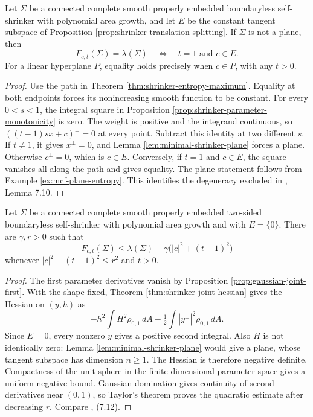 \begin{proposition}\label{prop:shrinker-gaussian-equality}
Let $\Sigma$ be a connected complete smooth properly embedded boundaryless self-shrinker with polynomial area growth, and let $E$ be the constant tangent subspace of Proposition \ref{prop:shrinker-translation-splitting}. If $\Sigma$ is not a plane, then
\[
 F_{c,t}(\Sigma)=\lambda(\Sigma)\quad\Longleftrightarrow\quad t=1\text{ and }c\in E.
\]
For a linear hyperplane $P$, equality holds precisely when $c\in P$, with any $t>0$.
\end{proposition}
\begin{proof}
Use the path in Theorem \ref{thm:shrinker-entropy-maximum}. Equality at both endpoints forces its nonincreasing smooth function to be constant. For every $0<s<1$, the integral square in Proposition \ref{prop:shrinker-parameter-monotonicity} is zero. The weight is positive and the integrand continuous, so
$((t-1)sx+c)^\perp=0$ at every point. Subtract this identity at two different $s$. If $t\ne1$, it gives $x^\perp=0$, and Lemma \ref{lem:minimal-shrinker-plane} forces a plane. Otherwise $c^\perp=0$, which is $c\in E$. Conversely, if $t=1$ and $c\in E$, the square vanishes all along the path and gives equality. The plane statement follows from Example \ref{ex:mcf-plane-entropy}. This identifies the degeneracy excluded in \cite{CM12}, Lemma 7.10.
\end{proof}

\begin{proposition}\label{prop:shrinker-local-entropy-gap}
Let $\Sigma$ be a connected complete smooth properly embedded two-sided boundaryless self-shrinker with polynomial area growth and with $E=\{0\}$. There are $\gamma,r>0$ such that
\[
 F_{c,t}(\Sigma)\leq\lambda(\Sigma)-\gamma\bigl(|c|^2+(t-1)^2\bigr)
\]
whenever $|c|^2+(t-1)^2\leq r^2$ and $t>0$.
\end{proposition}
\begin{proof}
The first parameter derivatives vanish by Proposition \ref{prop:gaussian-joint-first}. With the shape fixed, Theorem \ref{thm:shrinker-joint-hessian} gives the Hessian on $(y,h)$ as
\[
 -h^2\int H^2\rho_{0,1}\,dA-\tfrac12\int|y^\perp|^2\rho_{0,1}\,dA.
\]
Since $E=0$, every nonzero $y$ gives a positive second integral. Also $H$ is not identically zero: Lemma \ref{lem:minimal-shrinker-plane} would give a plane, whose tangent subspace has dimension $n\geq1$. The Hessian is therefore negative definite. Compactness of the unit sphere in the finite-dimensional parameter space gives a uniform negative bound. Gaussian domination gives continuity of second derivatives near $(0,1)$, so Taylor's theorem proves the quadratic estimate after decreasing $r$. Compare \cite{CM12}, (7.12).
\end{proof}

